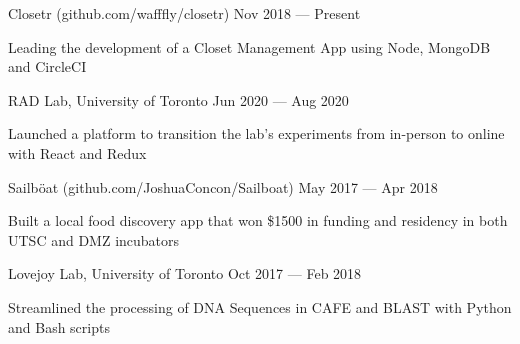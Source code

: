 \begin{cventries}
  \cventry
    {}
    {Closetr (github.com/wafffly/closetr)}
    {}
    {Nov 2018 --- Present}
    {}
    {
      \begin{cvitems}
        \item {Leading the development of a Closet Management App using Node, MongoDB and CircleCI}
      \end{cvitems}
    }
  \cventry
    {}
    {RAD Lab, University of Toronto}
    {}
    {Jun 2020 --- Aug 2020}
    {}
    {
      \begin{cvitems}
        \item {Launched a platform to transition the lab's experiments from in-person to online with React and Redux}
      \end{cvitems}
    }
  \cventry
    {}
    {Sailböat (github.com/JoshuaConcon/Sailboat)}
    {}
    {May 2017 --- Apr 2018}
    {}
    {
      \begin{cvitems}
        \item {Built a local food discovery app that won \$1500 in funding and residency in both UTSC and DMZ incubators}
      \end{cvitems}
    }
  \cventry
    {}
    {Lovejoy Lab, University of Toronto}
    {}
    {Oct 2017 --- Feb 2018}
    {}
    {
      \begin{cvitems}
        \item {Streamlined the processing of DNA Sequences in CAFE and BLAST with Python and Bash scripts}
      \end{cvitems}
    }
\end{cventries}